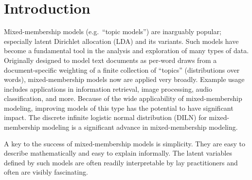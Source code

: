 \documentclass[twoside]{article}
\begin{document}
%

%

\makeatletter
\@copyrightspace
\makeatother

\section{Introduction}

Mixed-membership models (e.g.~``topic models'') are inarguably popular; especially latent Dirichlet allocation (LDA) \citep{Blei2003} and its variants.  Such models have become a fundamental tool in the analysis and exploration of many types of data.  Originally designed to model text documents as per-word draws from a document-specific weighting of a finite collection of ``topics'' (distributions over words), mixed-membership models now are applied very broadly.  Example usage includes applications in information retrieval, image processing, audio classification, and more.   Because of the wide applicability of mixed-membership modeling, improving models of this type has the potential to have significant impact. The discrete infinite logistic normal distribution (DILN) for mixed-membership modeling is a significant advance in mixed-membership modeling.

A key to the success of mixed-membership models is simplicity.  They are easy to describe mathematically and easy to explain informally.  The latent variables defined by such models are often readily interpretable by lay practitioners and often are visibly fascinating.
\end{document}
